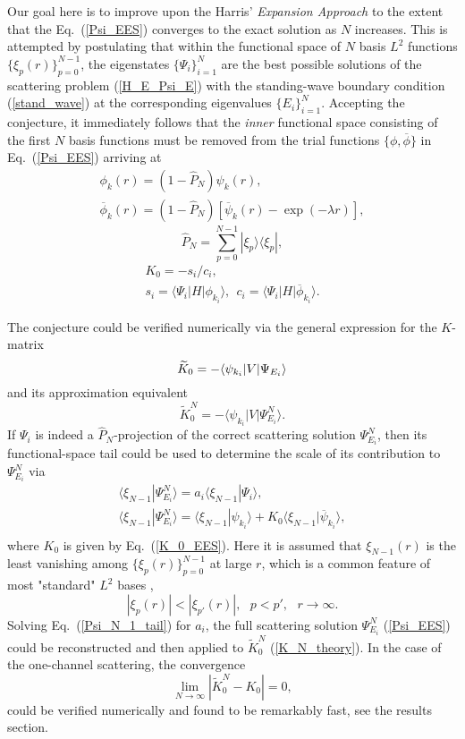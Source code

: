 \documentclass[aip
, pra
, showpacs
, aps
, twocolumn
, groupedaddress
, floatfix
]{revtex4}
\newcommand{\beq}{\begin{equation}}
\newcommand{\eeq}{\end{equation}}
\newcommand{\barr}{\begin{array}}
\newcommand{\earr}{\end{array}}
\begin{document}
Our goal here is to improve upon the Harris' {\em Expansion Approach} \cite{Harris67} to the extent that the Eq.~(\ref{Psi_EES})
converges to the exact solution as $N$ increases.
This is attempted by postulating that
within the functional space of $N$ basis $L^2$ functions  $\{\xi_p(r)\}_{p=0}^{N-1}$,
the eigenstates $\{\Psi_i\}_{i=1}^{N}$ are the best possible solutions of the scattering problem (\ref{H_E_Psi_E})
with the standing-wave boundary condition (\ref{stand_wave}) at the corresponding eigenvalues $\{E_i\}_{i=1}^{N}$.
Accepting the conjecture, it immediately follows that the {\em inner} functional space consisting of the first $N$ basis functions
must be removed from the trial functions $\{\phi,\overline{\phi}\}$ in Eq.~(\ref{Psi_EES}) arriving at
\beq \barr{l}
\phi_k(r) = (1-\hat{P}_N) \psi_k(r),\\
\overline{\phi}_k(r) = (1-\hat{P}_N) [\overline{\psi}_k(r) - \exp{(-\lambda r)}],
\earr \label{def_phi} \eeq
\beq
\hat{P}_N = \sum_{p=0}^{N-1} | \xi_p \rangle \langle \xi_p |,
\label{P_N} \eeq
\beq \barr{l}
K_{0} = - s_i / c_i, \\ 
s_i = \langle\Psi_i|H|  \phi_{k_i} \rangle, \ \ 
c_i =  \langle\Psi_i|H|  \overline{\phi}_{k_i} \rangle.
\earr \label{K_0_EES} \eeq


The conjecture could be verified numerically via the general expression for the $K$-matrix \cite{N82}
\beq
\widetilde{K}_0 = -\langle \psi_{k_i} | V | \Psi_{E_i} \rangle\\
\label{K_theory}\eeq
and its approximation equivalent
\beq
\widetilde{K}^N_0 = -\langle \psi_{k_i} | V | \Psi^N_{E_i} \rangle.
\label{K_N_theory}\eeq
If $\Psi_i$ is indeed a $\hat{P}_N$-projection of the correct scattering solution $\Psi^N_{E_i}$,
then its functional-space tail could be used to
determine the scale of its contribution to $\Psi^N_{E_i}$ via
\beq \barr{l}
\langle \xi_{N-1} | \Psi^N_{E_i}\rangle
= a_i \langle \xi_{N-1}| \Psi_i \rangle,\\
\langle \xi_{N-1} | \Psi^N_{E_i}\rangle
 =  \langle \xi_{N-1}| \psi_{k_i} \rangle
+ K_0 \langle \xi_{N-1}| \overline{\psi}_{k_i} \rangle,\\
\earr \label{Psi_N_1_tail} \eeq
where $K_0$ is given by Eq.~(\ref{K_0_EES}).
Here it is assumed that $\xi_{N-1}(r)$ is the least vanishing among $\{\xi_p(r)\}_{p=0}^{N-1}$  at large $r$, which is
a common feature of most "standard" $L^2$ bases \cite{abramowitz},
\beq
|\xi_p(r)| < |\xi_{p'}(r)|, \ \ \ p<p', \ \ \ r \rightarrow \infty.
\eeq
Solving Eq.~(\ref{Psi_N_1_tail}) for $a_i$,
the full scattering solution $\Psi^N_{E_i}$ (\ref{Psi_EES}) could be reconstructed and then applied to $\widetilde{K}^N_0$ (\ref{K_N_theory}). 
In the case of the one-channel scattering, the convergence  
\beq
\lim_{N \rightarrow \infty} |\widetilde{K}^N_0 - K_0 | = 0,
\label{K_N_0_lim} \eeq
could be verified numerically and found to be
remarkably fast, see the results section.
\end{document}
